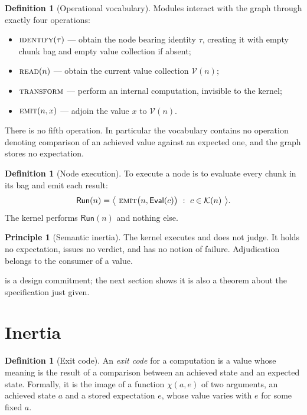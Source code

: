 \documentclass[11pt,a4paper]{article}
\theoremstyle{thmstyle}
\theoremstyle{definition}
\newtheorem{definition}[theorem]{Definition}
\newtheorem{principle}[theorem]{Principle}
\theoremstyle{remark}
\newcommand{\Node}{n}
\newcommand{\Chunks}{\mathcal{K}}
\newcommand{\Vals}{\mathcal{V}}
\newcommand{\Run}{\mathsf{Run}}
\newcommand{\Eval}{\mathsf{Eval}}
\newcommand{\emit}{\textsc{emit}}
\newcommand{\readop}{\textsc{read}}
\newcommand{\ident}{\textsc{identify}}
\newcommand{\transf}{\textsc{transform}}
\begin{document}
\begin{definition}[Operational vocabulary]
\label{def:vocab}
Modules interact with the graph through exactly four operations:
\begin{itemize}[leftmargin=1.6em,nosep]
\item $\ident(\tau)$ --- obtain the node bearing identity $\tau$, creating
it with empty chunk bag and empty value collection if absent;
\item $\readop(\Node)$ --- obtain the current value collection
$\Vals(\Node)$;
\item $\transf$ --- perform an internal computation, invisible to the
kernel;
\item $\emit(\Node,x)$ --- adjoin the value $x$ to $\Vals(\Node)$.
\end{itemize}
There is no fifth operation. In particular the vocabulary contains no
operation denoting comparison of an achieved value against an expected one,
and the graph stores no expectation.
\end{definition}

\begin{definition}[Node execution]
\label{def:exec}
To execute a node is to evaluate every chunk in its bag and emit each
result:
\[
\Run(\Node)=\bigl\langle\ \emit\bigl(\Node,\Eval(c)\bigr)\ :\ c\in\Chunks(\Node)\ \bigr\rangle .
\]
The kernel performs $\Run(\Node)$ and nothing else.
\end{definition}

\begin{principle}[Semantic inertia]
\label{prin:inertia}
The kernel executes and does not judge. It holds no expectation, issues no
verdict, and has no notion of failure. Adjudication belongs to the consumer
of a value.
\end{principle}

 is a design commitment; the next section shows it is
also a theorem about the specification just given.

\section{Inertia}
\label{sec:inertia}

\begin{definition}[Exit code]
\label{def:exitcode}
An \emph{exit code} for a computation is a value whose meaning is the result
of a comparison between an achieved state and an expected state. Formally,
it is the image of a function $\chi(a,e)$ of two arguments, an achieved
state $a$ and a stored expectation $e$, whose value varies with $e$ for some
fixed $a$.
\end{definition}
\end{document}
